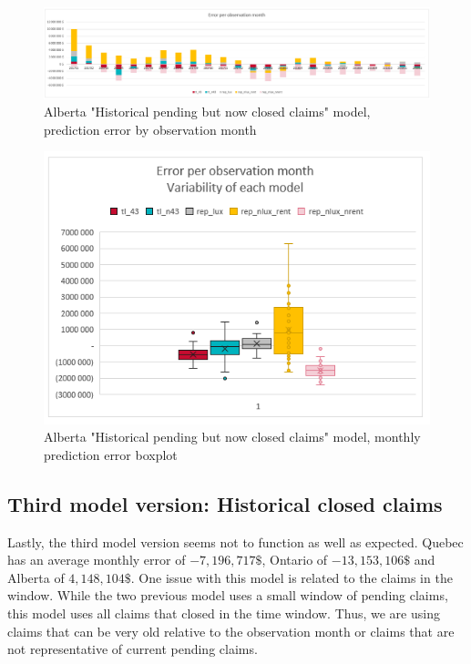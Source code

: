		\begin{figure}[H]
			\begin{center}
				\includegraphics[scale=0.4]{Graphiques/AB_closedonly_model_by_month} 
				\renewcommand{\figurename}{Figure}
				\caption[Alberta version two model error]{Alberta "Historical pending but now closed claims" model, prediction error by observation month}\label{Fig_AB_closedonly_er_by_month}
			\end{center}
		\end{figure}
		\begin{figure}[H]
			\begin{center}
				\includegraphics[scale=0.4]{Graphiques/AB_closedonly_model_mustach} 
				\renewcommand{\figurename}{Figure}
				\caption[Alberta version two model error - boxplot]{Alberta "Historical pending but now closed claims" model, monthly prediction error boxplot}\label{Fig_AB_closedonly_er_boxplot}
			\end{center}
		\end{figure}
	
\subsection{Third model version: Historical closed claims }
	Lastly, the third model version seems not to function as well as expected. Quebec has an average monthly error of $-7,196,717 \$ $, Ontario of $-13,153,106 \$ $ and Alberta of $4,148,104 \$ $. One issue with this model is related to the claims in the window. While the two previous model uses a small window of pending claims, this model uses all claims that closed in the time window. Thus, we are using claims that can be very old relative to the observation month or claims that are not representative of current pending claims. 
	
	
		 